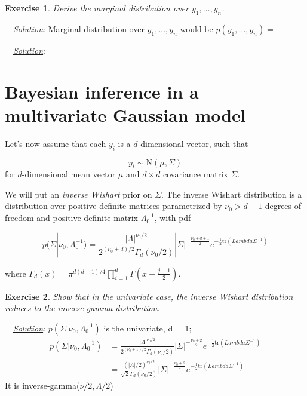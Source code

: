 \documentclass[twoside]{article}
\newcounter{lecnum}
\newtheorem{exercise}{Exercise}[lecnum]
\newenvironment{solution}{
  \begin{flushleft} \noindent ~~\underline{\emph{Solution}}: \rmfamily}{\end{flushleft}}
\begin{document}
\begin{exercise}
  Derive the marginal distribution over $y_1,\dots, y_n$.
\end{exercise}

\begin{solution}
Marginal distribution over $y_1,\dots, y_n$ would be $p(y_1,\dots, y_n) = $
\end{solution}

\begin{solution}
\end{solution}

\section{Bayesian inference in a multivariate Gaussian model}

Let's now assume that each $y_i$ is a $d$-dimensional vector, such that

$$y_i \sim \mbox{N}(\mu, \Sigma)$$
for $d$-dimensional mean vector $\mu$ and $d\times d$ covariance matrix $\Sigma$.

We will put an \textit{inverse Wishart} prior on $\Sigma$. The inverse Wishart distribution is a distribution over positive-definite matrices parametrized by $\nu_0>d-1$ degrees of freedom and  positive definite matrix $\Lambda_0^{-1}$, with pdf

$$p(\Sigma|\nu_0, \Lambda_0^{-1}) = \frac{|\Lambda|^{\nu_0/2}}{2^{(\nu_0 +d)/2}\Gamma_d(\nu_0/2)}|\Sigma|^{-\frac{\nu_0+d+1}{2}}e^{-\frac{1}{2}\mbox{tr}(Lambda\Sigma^{-1})}$$

where
$\Gamma_d(x) = \pi^{d(d-1)/4}\prod_{i=1}^d\Gamma\left(x-\frac{j-1}{2}\right)$.

\begin{exercise}
  Show that in the univariate case, the inverse Wishart distribution reduces to the inverse gamma distribution.
\end{exercise}



\begin{solution}
$p(\Sigma|\nu_0, \Lambda_0^{-1})$ is the univariate, d = 1; 
\begin{equation}
\begin{split}
p(\Sigma|\nu_0, \Lambda_0^{-1}) &= \frac{|\Lambda|^{\nu_0/2}}{2^{(\nu_0 +1)/2}\Gamma_d(\nu_0/2)}|\Sigma|^{-\frac{\nu_0+2}{2}}e^{-\frac{1}{2}\mbox{tr}(Lambda\Sigma^{-1})} \\ &= \frac{(|\Lambda|/2)^{\nu_0/2}}{\sqrt{2}\Gamma_d(\nu_0/2)}|\Sigma|^{-\frac{\nu_0+2}{2}}e^{-\frac{1}{2}\mbox{tr}(Lambda\Sigma^{-1})}
\end{split}
\end{equation}
It is inverse-gamma($\nu/2, \Lambda/2$)
\end{solution}
\end{document}
